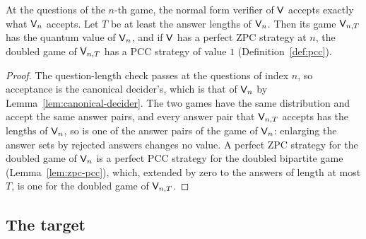 \begin{lemma}
\label{lem:of-tnfv}
\leanok
At the questions of the $n$-th game, the normal form verifier of $\mathsf{V}$ accepts exactly what
$\mathsf{V}_n$ accepts. Let $T$ be at least the answer lengths of $\mathsf{V}_n$. Then its game
$\mathsf{V}_{n,T}$ has the quantum value of $\mathsf{V}_n$, and if $\mathsf{V}$ has a perfect ZPC
strategy at $n$, the doubled game of $\mathsf{V}_{n,T}$ has a PCC strategy of value $1$
(Definition~\ref{def:pcc}).
\end{lemma}

\begin{proof}
\leanok
The question-length check passes at the questions of index $n$, so acceptance is the canonical
decider's, which is that of $\mathsf{V}_n$ by Lemma~\ref{lem:canonical-decider}. The two games
have the same distribution and accept the same answer pairs, and every answer pair that
$\mathsf{V}_{n,T}$ accepts has the lengths of $\mathsf{V}_n$, so is one of the answer pairs of the
game of $\mathsf{V}_n$: enlarging the answer sets by rejected answers changes no value. A perfect
ZPC strategy for the doubled game of $\mathsf{V}_n$ is a perfect PCC strategy for the doubled
bipartite game (Lemma~\ref{lem:zpc-pcc}), which, extended by zero to the answers of length at
most $T$, is one for the doubled game of $\mathsf{V}_{n,T}$.
\end{proof}

\subsection{The target}

